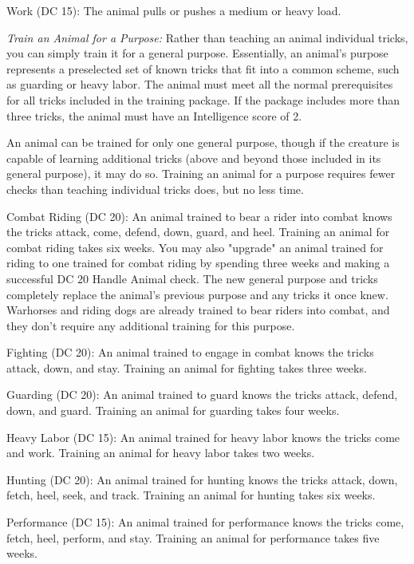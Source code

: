 Work (DC 15): The animal pulls or pushes a medium or heavy load.

\vspace{12pt}
\textit{Train an Animal for a Purpose:} Rather than teaching an animal individual 
tricks, you can simply train it for a general purpose. Essentially, an animal's 
purpose represents a preselected set of known tricks that fit into a common scheme, 
such as guarding or heavy labor. The animal must meet all the normal prerequisites 
for all tricks included in the training package. If the package includes more than 
three tricks, the animal must have an Intelligence score of 2.

An animal can be trained for only one general purpose, though if the creature is 
capable of learning additional tricks (above and beyond those included in its general 
purpose), it may do so. Training an animal for a purpose requires fewer checks 
than teaching individual tricks does, but no less time. 

Combat Riding (DC 20): An animal trained to bear a rider into combat knows the 
tricks attack, come, defend, down, guard, and heel. Training an animal for combat 
riding takes six weeks. You may also "upgrade" an animal trained for riding to 
one trained for combat riding by spending three weeks and making a successful DC 
20 Handle Animal check. The new general purpose and tricks completely replace the 
animal's previous purpose and any tricks it once knew. Warhorses and riding dogs 
are already trained to bear riders into combat, and they don't require any additional 
training for this purpose.

Fighting (DC 20): An animal trained to engage in combat knows the tricks attack, 
down, and stay. Training an animal for fighting takes three weeks.

Guarding (DC 20): An animal trained to guard knows the tricks attack, defend, down, 
and guard. Training an animal for guarding takes four weeks.

Heavy Labor (DC 15): An animal trained for heavy labor knows the tricks come and 
work. Training an animal for heavy labor takes two weeks.

Hunting (DC 20): An animal trained for hunting knows the tricks attack, down, fetch, 
heel, seek, and track. Training an animal for hunting takes six weeks.

Performance (DC 15): An animal trained for performance knows the tricks come, fetch, 
heel, perform, and stay. Training an animal for performance takes five weeks.


